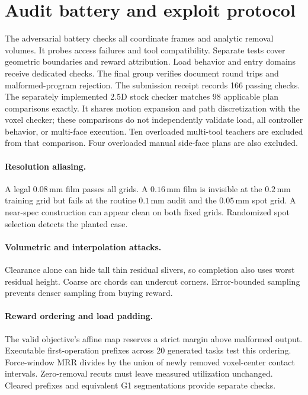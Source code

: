 \documentclass{article}
\begin{document}
\section{Audit battery and exploit protocol}
\label{app:audit}

The adversarial battery checks all coordinate frames and analytic
removal volumes.  It probes access failures and tool compatibility.
Separate tests cover geometric boundaries and reward attribution.
Load behavior and entry domains receive dedicated checks.  The final
group verifies document round trips and malformed-program rejection.
The submission receipt records 166 passing checks.  The separately
implemented 2.5D stock checker matches 98 applicable plan comparisons
exactly. It shares motion expansion and path discretization with the
voxel checker; these comparisons do not independently validate load,
all controller behavior, or multi-face execution.
Ten overloaded multi-tool teachers are excluded from that comparison.
Four overloaded manual side-face plans are also excluded.

\paragraph{Resolution aliasing.}
A legal $0.08$\,mm film passes all grids.  A $0.16$\,mm film is invisible
at the $0.2$\,mm training grid but fails at the routine $0.1$\,mm audit
and the $0.05$\,mm spot grid.  A near-spec construction can appear clean
on both fixed grids.  Randomized spot selection detects the planted case.

\paragraph{Volumetric and interpolation attacks.}
Clearance alone can hide tall thin residual slivers, so completion also
uses worst residual height.  Coarse arc chords can undercut corners.
Error-bounded sampling prevents denser sampling from buying reward.

\paragraph{Reward ordering and load padding.}
The valid objective's affine map reserves a strict margin above malformed
output.  Executable first-operation prefixes across 20 generated tasks test
this ordering.  Force-window MRR divides by the union of newly removed
voxel-center contact intervals.  Zero-removal recuts must leave measured
utilization unchanged.  Cleared prefixes and equivalent G1 segmentations
provide separate checks.
\end{document}
